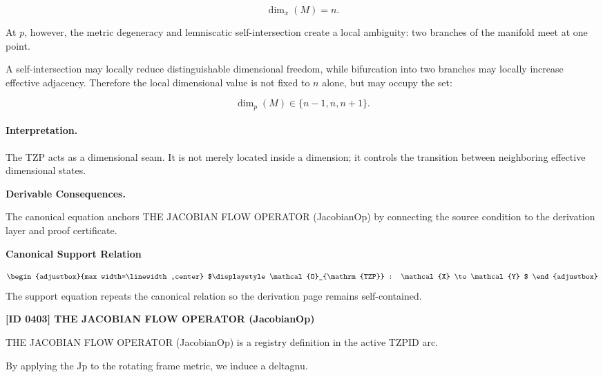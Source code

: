 \begin{equation}
\dim_x(M)=n .
\end{equation}

At $p$, however, the metric degeneracy and lemniscatic self-intersection create a local ambiguity: two branches of the manifold meet at one point.

A self-intersection may locally reduce distinguishable dimensional freedom, while bifurcation into two branches may locally increase effective adjacency. Therefore the local dimensional value is not fixed to $n$ alone, but may occupy the set:

\begin{equation}
\dim_p(M)\in\{n-1,n,n+1\}.
\end{equation}

\paragraph{Interpretation.}
The TZP acts as a dimensional seam. It is not merely located inside a dimension; it controls the transition between neighboring effective dimensional states.

\par\vspace{0.35em}
\noindent\textbf{Derivable Consequences.}\quad
\begingroup
\footnotesize
\raggedright
The canonical equation anchors THE JACOBIAN FLOW OPERATOR (JacobianOp) by connecting the source condition to the derivation layer and proof certificate.
\par\endgroup

\noindent\textbf{Canonical Support Relation}\par
\[
\begin{adjustbox}{max width=\linewidth,center}
$\displaystyle
\mathcal{O}_{\mathrm{TZP}} : \mathcal{X} \to \mathcal{Y}
$
\end{adjustbox}
\]
\noindent The support equation repeats the canonical relation so the derivation page remains self-contained.\par

\clearpage
\noindent\textbf{[ID 0403] THE JACOBIAN FLOW OPERATOR (JacobianOp)}\par
\vspace{0.35em}
\begingroup\small
{}
THE JACOBIAN FLOW OPERATOR (JacobianOp) is a registry definition in the active TZPID arc.

By applying the Jp to the rotating frame metric, we induce a deltagnu.

